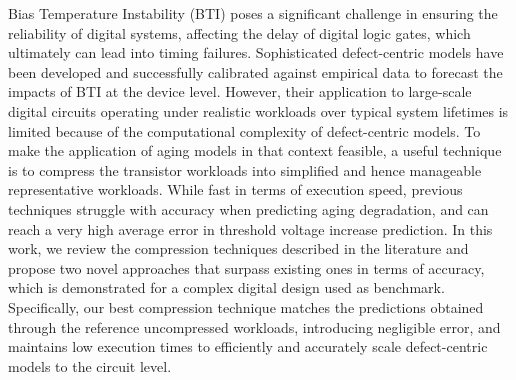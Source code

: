 \label{ch:chapter02}
Bias Temperature Instability (BTI) poses a significant challenge in ensuring the reliability of digital systems, affecting the delay of digital logic gates, which ultimately can lead into timing failures. Sophisticated defect-centric models have been developed and successfully calibrated against empirical data to forecast the impacts of BTI at the device level. However, their application to large-scale digital circuits operating under realistic workloads over typical system lifetimes is limited because of the computational complexity of defect-centric models. To make the application of aging models in that context feasible, a useful technique is to compress the transistor workloads into simplified and hence manageable representative workloads. While fast in terms of execution speed, previous techniques struggle with accuracy when predicting aging degradation, and can reach a very high average error in threshold voltage increase prediction. In this work, we review the compression techniques described in the literature and propose two novel approaches that surpass existing ones in terms of accuracy, which is demonstrated for a complex digital design used as benchmark. Specifically, our best compression technique matches the predictions obtained through the reference uncompressed workloads, introducing negligible error, and maintains low execution times to efficiently and accurately scale defect-centric models to the circuit level.


